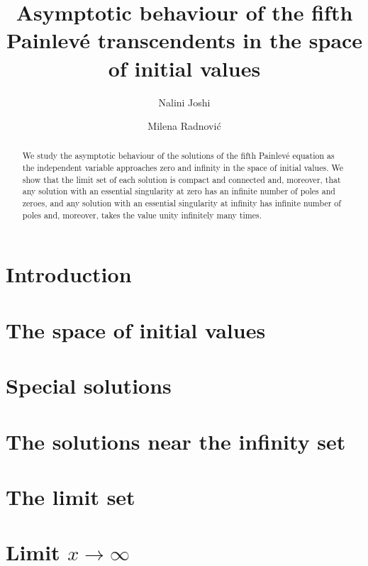 \documentclass[12pt]{amsart}
\title[Asymptotics of $\PV$]{Asymptotic behaviour of the fifth Painlev\'e transcendents in the space of initial values}
\author{Nalini Joshi}
\author{Milena Radnovi\'c}
\date{}
\numberwithin{equation}{section}
\begin{document}
\maketitle

\begin{abstract}
We study the asymptotic behaviour of the solutions of the fifth Painlev\'e equation as the independent variable approaches zero and infinity in the space of initial values.
We show that the limit set of each solution is compact and connected and, moreover, that any solution with an essential singularity at zero has an infinite number of poles and zeroes, and any solution with an essential singularity at infinity has infinite number of poles and, moreover, takes the value unity infinitely many times.
\end{abstract}


\section{Introduction}



\section{The space of initial values}
\label{sec:space}


\section{Special solutions}
\label{sec:special}


\section{The solutions near the infinity set}
\label{sec:infinity}


\section{The limit set}
\label{sec:limit}


\section{Limit $x\to\infty$}
\label{sec:x_infinity}

\end{document}
